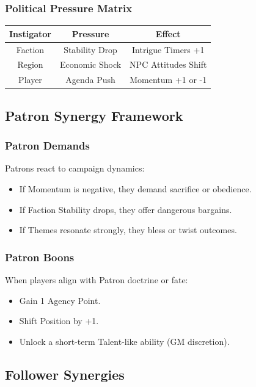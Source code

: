 \documentclass[11pt]{article}
\begin{document}
\subsubsection{Political Pressure Matrix}
\begin{center}
\begin{longtable}{|c|c|c|}
\hline
\textbf{Instigator} & \textbf{Pressure} & \textbf{Effect} \\
\hline
Faction & Stability Drop & Intrigue Timers +1 \\
Region & Economic Shock & NPC Attitudes Shift \\
Player & Agenda Push & Momentum +1 or -1 \\
\hline
\end{longtable}
\end{center}

\subsection{Patron Synergy Framework}

\subsubsection{Patron Demands}
Patrons react to campaign dynamics:
\begin{itemize}
    \item If Momentum is negative, they demand sacrifice or obedience.
    \item If Faction Stability drops, they offer dangerous bargains.
    \item If Themes resonate strongly, they bless or twist outcomes.
\end{itemize}

\subsubsection{Patron Boons}
When players align with Patron doctrine or fate:
\begin{itemize}
    \item Gain 1 Agency Point.
    \item Shift Position by +1.
    \item Unlock a short-term Talent-like ability (GM discretion).
\end{itemize}

\subsection{Follower Synergies}
\end{document}
